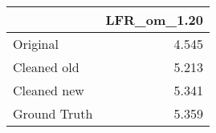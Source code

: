 \begin{tabular}{lr}
\toprule
{} & LFR_om_1.20 \\
\midrule
Original     &       4.545 \\
Cleaned old  &       5.213 \\
Cleaned new  &       5.341 \\
Ground Truth &       5.359 \\
\bottomrule
\end{tabular}
